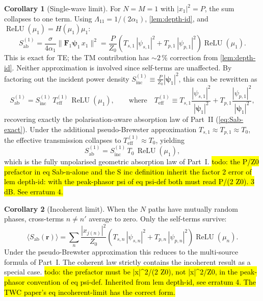 \documentclass[11pt,a4paper]{article}
\theoremstyle{definition}      %
\newtheorem{corollary}[corollary]{Corollary}
\newcommand{\rr}{\mathbf{r}}
\newcommand{\Sab}{S_{\mathrm{ab}}}
\newcommand{\Teff}{T_{\mathrm{eff}}}
\DeclareMathOperator{\ReLU}{ReLU}
\begin{document}
\begin{corollary}[Single-wave limit]\label{cor:single-wave}
For $N = M = 1$ with $|x_1|^2 = P$, the sum collapses to one
term.  Using $\Lambda_{11} = 1/(2\alpha_1)$, \cref{lem:depth-id},
and $\ReLU(\mu_1) = H(\mu_1)\mu_1$:
\begin{equation}\label{eq:Sab-n-alone}
  \Sab^{(1)} = \frac{\sigma}{4\alpha_1}
  \|\mathbf{F}_1\boldsymbol{\psi}_1\,x_1\|^2
  = \frac{P}{Z_0}\left(T_{s,1}\,|\psi_{s,1}|^2
    + T_{p,1}\,|\psi_{p,1}|^2\right)\ReLU(\mu_1).
\end{equation}
This is exact for TE; the TM contribution has $\sim\!2\,\%$ correction
from \cref{lem:depth-id}. Neither approximation is involved since
self-terms are unaffected. By factoring out the incident power density
$S_{\mathrm{inc}}^{(1)} \equiv \frac{P}{Z_0}|\boldsymbol{\psi}_1|^2$,
this can be rewritten as
\begin{equation}\label{eq:Sab-n-PartII}
  \Sab^{(1)} = S_{\mathrm{inc}}^{(1)}\,\Teff^{(1)}\,\ReLU(\mu_1),
  \qquad \text{where} \quad
  \Teff^{(1)} \equiv T_{s,1}\frac{|\psi_{s,1}|^2}{|\boldsymbol{\psi}_1|^2}
    + T_{p,1}\frac{|\psi_{p,1}|^2}{|\boldsymbol{\psi}_1|^2},
\end{equation}
recovering exactly the polarisation-aware absorption law of Part~II
(\cref{eq:Sab-exact}). Under the additional pseudo-Brewster approximation
$T_{s,1}\approx T_{p,1}\approx T_0$, the effective transmission
collapses to $\Teff^{(1)} \approx T_0$, yielding
\begin{equation}\label{eq:Sab-n-PB}
  \Sab^{(1)} = S_{\mathrm{inc}}^{(1)}\,T_0\,\ReLU(\mu_1),
\end{equation}
which is the fully unpolarised geometric absorption law of Part~I.
\hl{todo: the P/Z0 prefactor in eq Sab-n-alone and the S inc
definition inherit the factor 2 error of lem depth-id: with the
peak-phasor psi of eq psi-def both must read P/(2 Z0). 3 dB. See
erratum 4.}
\end{corollary}

\begin{corollary}[Incoherent limit]\label{cor:incoherent}
When the $N$ paths have mutually random phases, cross-terms
$n \neq n'$ average to zero.  Only the self-terms survive:
\begin{equation}
  \langle\Sab(\rr)\rangle = \sum_n
  \frac{|x_{j(n)}|^2}{Z_0}
  \left(T_{s,n}\,|\psi_{s,n}|^2 + T_{p,n}\,|\psi_{p,n}|^2\right)
  \ReLU(\mu_n).
\end{equation}
Under the pseudo-Brewster approximation this reduces to the
multi-source formula of Part~I\@.  The coherent law strictly
contains the incoherent result as a special case.
\hl{todo: the prefactor must be |x|^2/(2 Z0), not |x|^2/Z0, in the
peak-phasor convention of eq psi-def. Inherited from lem depth-id, see
erratum 4. The TWC paper's eq incoherent-limit has the correct form.}
\end{corollary}
\end{document}
